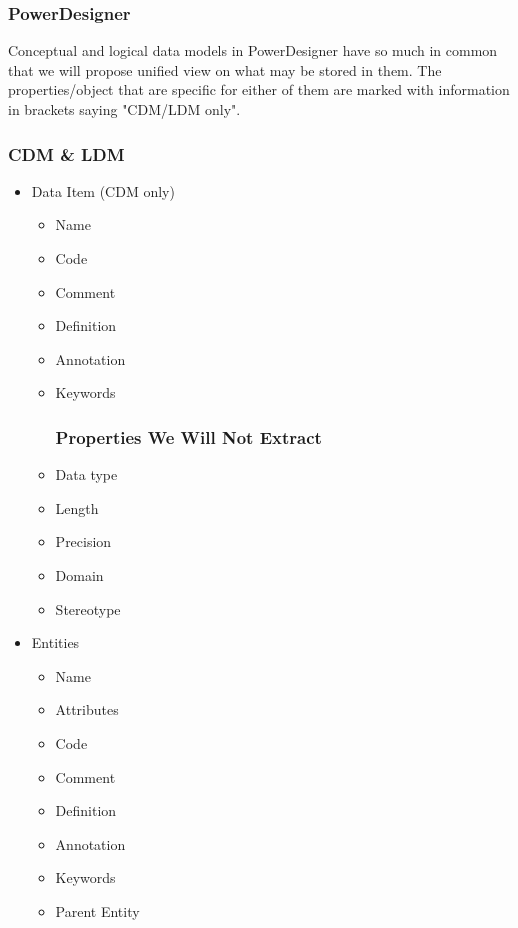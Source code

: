 \documentclass[12pt,a4paper]{report}
\begin{document}
\subsubsection{PowerDesigner}

Conceptual and logical data models in PowerDesigner have so much in common that we will propose unified view on what may be stored in them. The properties/object that are specific for either of them are marked with information in brackets saying "CDM/LDM only".

\subsubsection{CDM \& LDM}

\begin{itemize}
	\item Data Item (CDM only)
	\begin{itemize}
		\item Name
		\item Code 
		\item Comment
		\item Definition
		\item Annotation
		\item Keywords
		\subsubsection{Properties We Will Not Extract}
		\item Data type
		\item Length
		\item Precision
		\item Domain
		\item Stereotype
	\end{itemize}
	\item Entities
	\begin{itemize}
		\item Name 
		\item Attributes
		\item Code 
		\item Comment
		\item Definition
		\item Annotation
		\item Keywords
		\item Parent Entity

\end{itemize}
\end{itemize}
\end{document}
